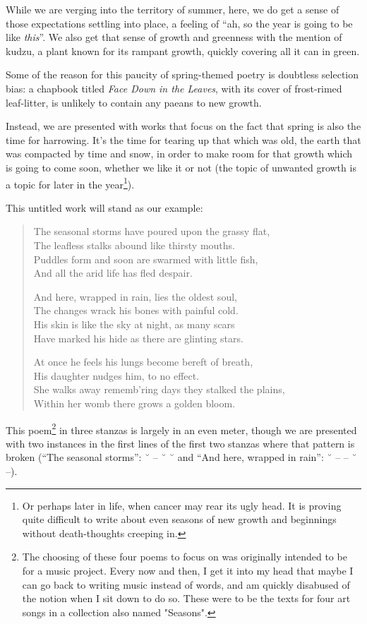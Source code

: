 \documentclass{memoir}
\begin{document}
While we are verging into the territory of summer, here, we do get a sense of those expectations settling into place, a feeling of ``ah, so the year is going to be like \emph{this}''. We also get that sense of growth and greenness with the mention of kudzu, a plant known for its rampant growth, quickly covering all it can in green.

Some of the reason for this paucity of spring-themed poetry is doubtless selection bias: a chapbook titled \emph{Face Down in the Leaves}, with its cover of frost-rimed leaf-litter, is unlikely to contain any paeans to new growth.

Instead, we are presented with works that focus on the fact that spring is also the time for harrowing. It's the time for tearing up that which was old, the earth that was compacted by time and snow, in order to make room for that growth which is going to come soon, whether we like it or not (the topic of unwanted growth is a topic for later in the year\footnote{Or perhaps later in life, when cancer may rear its ugly head. It is proving quite difficult to write about even seasons of new growth and beginnings without death-thoughts creeping in.}).

This untitled work will stand as our example:

\begin{verse}
The seasonal storms have poured upon the grassy flat, \\
The leafless stalks abound like thirsty mouths. \\
Puddles form and soon are swarmed with little fish, \\
And all the arid life has fled despair.

And here, wrapped in rain, lies the oldest soul, \\
The changes wrack his bones with painful cold. \\
His skin is like the sky at night, as many scars \\
Have marked his hide as there are glinting stars.

At once he feels his lungs become bereft of breath, \\
His daughter nudges him, to no effect. \\
She walks away rememb'ring days they stalked the plains, \\
Within her womb there grows a golden bloom.

\parencite[26]{leaves}
\end{verse}

This poem\footnote{The choosing of these four poems to focus on was originally intended to be for a music project. Every now and then, I get it into my head that maybe I can go back to writing music instead of words, and am quickly disabused of the notion when I sit down to do so. These were to be the texts for four art songs in a collection also named "Seasons".} in three stanzas is largely in an even meter, though we are presented with two instances in the first lines of the first two stanzas where that pattern is broken (``The seasonal storms'': ˘ -- ˘ ˘ and ``And here, wrapped in rain'': ˘ -- -- ˘ --).
\end{document}
